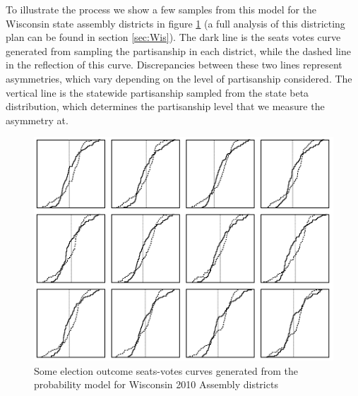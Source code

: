 \documentclass[preprint,12pt]{article}
\begin{document}
To illustrate the process we show a few samples from this model for the Wisconsin state assembly districts in figure \ref{fig:SVAssembly2010} (a full analysis of this districting plan can be found in section \ref{sec:Wis}).
The dark line is the seats votes curve generated from sampling the partisanship in each district, while the dashed line in the reflection of this curve.
Discrepancies between these two lines represent asymmetries, which vary depending on the level of partisanship considered.
The vertical line is the statewide partisanship sampled from the state beta distribution, which determines the partisanship level that we measure the asymmetry at.

\begin{figure}[htb!]
    \begin{center}
        \includegraphics[scale=0.45]{../Figures/WI2010/sv_curves_assembly.png}
        \caption{Some election outcome seats-votes curves generated from the probability model for Wisconsin 2010 Assembly districts}\label{fig:SVAssembly2010}
    \end{center}
\end{figure}
\end{document}
